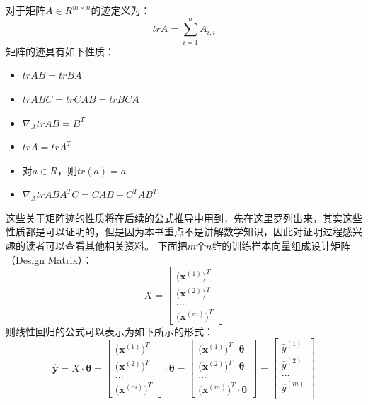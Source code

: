 \documentclass[UTF8]{article}
\begin{document}
对于矩阵$A \in R^{m \times n}$的迹定义为：
\begin{equation}
tr A = \sum_{i=1}^{n} A_{i,i}
\label{lrrn-matrix-tr-def}
\end{equation}
矩阵的迹具有如下性质：
\begin{itemize}
\item $trAB = trBA$
\item $trABC = trCAB = trBCA$
\item $\nabla _{A} trAB = B^{T}$
\item $trA = trA^{T}$
\item 对$a \in R$，则$tr(a)=a$
\item $\nabla _{A} trABA^{T}C = CAB + C^{T}AB^{T}$
\end{itemize}
这些关于矩阵迹的性质将在后续的公式推导中用到，先在这里罗列出来，其实这些性质都是可以证明的，但是因为本书重点不是讲解数学知识，因此对证明过程感兴趣的读者可以查看其他相关资料。\newline
下面把$m$个$n$维的训练样本向量组成设计矩阵（Design Matrix）：
\begin{equation}
X = \begin{bmatrix}
\Big( \boldsymbol{x}^{(1)} \Big)^{T} \\
\Big( \boldsymbol{x}^{(2)} \Big)^{T} \\
... \\
\Big( \boldsymbol{x}^{(m)} \Big)^{T}
\end{bmatrix}
\label{lrrn-design-matrix-def}
\end{equation}
则线性回归的公式可以表示为如下所示的形式：
\begin{equation}
\hat{\boldsymbol{y}} = X \cdot \boldsymbol{\theta} = \begin{bmatrix}
\Big( \boldsymbol{x}^{(1)} \Big)^{T} \\
\Big( \boldsymbol{x}^{(2)} \Big)^{T} \\
... \\
\Big( \boldsymbol{x}^{(m)} \Big)^{T}
\end{bmatrix} \cdot \boldsymbol{\theta} = \begin{bmatrix}
\Big( \boldsymbol{x}^{(1)} \Big)^{T} \cdot \boldsymbol{\theta} \\
\Big( \boldsymbol{x}^{(2)} \Big)^{T} \cdot \boldsymbol{\theta} \\
... \\
\Big( \boldsymbol{x}^{(m)} \Big)^{T} \cdot \boldsymbol{\theta}
\end{bmatrix} = \begin{bmatrix}
\hat{y}^{(1)} \\
\hat{y}^{(2)} \\
... \\
\hat{y}^{(m)} \\
\end{bmatrix}
\label{lrrn-linear-regression-formula-in-design-matrix}
\end{equation}
\end{document}
